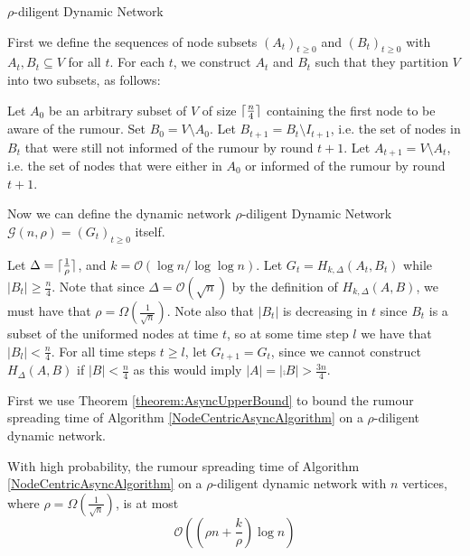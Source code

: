 \begin{definition}
	$\rho$-diligent Dynamic Network
	
	First we define the sequences of node subsets $(A_t)_{t\geq 0}$ and $(B_t)_{t\geq0}$ with $A_t, B_t \subseteq V$ for all $t$. For each $t$, we construct $A_t$ and $B_t$ such that they partition $V$ into two subsets, as follows:

	Let $A_0$ be an arbitrary subset of $V$ of size $\lceil\frac{n}{4}\rceil$ containing the first node to be aware of the rumour. %
	Set $B_0 = V \setminus A_0$. Let $B_{t+1} = B_t \setminus I_{t+1}$, i.e. the set of nodes in $B_t$ that were still not informed of the rumour by round $t+1$. Let $A_{t+1} = V \setminus A_t$, i.e. the set of nodes that were either in $A_0$ or informed of the rumour by round $t+1$.

	Now we can define the dynamic network $\rho$-diligent Dynamic Network $\mathcal{G}(n, \rho) = (G_t)_{t\geq 0}$ itself. 

	Let $\Delta = \lceil\frac{1}{\rho}\rceil$, and $k = \mathcal{O}(\log n / \log \log n)$.
	Let $G_t = H_{k, \Delta}(A_t, B_t)$ while $|B_t| \geq \frac{n}{4}$. Note that since $\Delta = \mathcal{O}(\sqrt{n})$ by the definition of $H_{k, \Delta}(A,B)$, we must have that $\rho = \Omega\left(\frac{1}{\sqrt{n}}\right)$.
	Note also that $|B_t|$ is decreasing in $t$ since $B_t$ is a subset of the uniformed nodes at time $t$, so at some time step $l$ we have that $|B_l| < \frac{n}{4}$. For all time steps $t \geq l$, let $G_{t+1} = G_t$, since we cannot construct $H_\Delta(A,B)$ if $|B| < \frac{n}{4}$ as this would imply $|A| = |\comp{B}| > \frac{3n}{4}$. %
\end{definition}

First we use Theorem \ref{theorem:AsyncUpperBound} to bound the rumour spreading time of Algorithm \ref{NodeCentricAsyncAlgorithm} on a $\rho$-diligent dynamic network.

\begin{theorem}
	With high probability, the rumour spreading time of Algorithm \ref{NodeCentricAsyncAlgorithm} on a $\rho$-diligent dynamic network with $n$ vertices, where $\rho = \Omega(\frac{1}{\sqrt{n}})$, is at most 
	$$
		\mathcal{O}\left(\left(\rho n + \frac{k}{\rho}\right)\log n\right)
	$$
\end{theorem}

